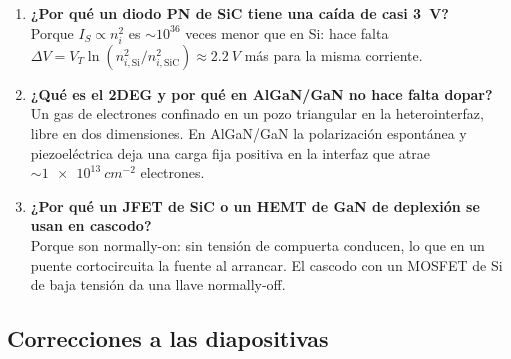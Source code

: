 \begin{enumerate}
  competitivo.
  \item \textbf{¿Por qué un diodo PN de SiC tiene una caída de casi \SI{3}{V}?}\\
  Porque $I_S\propto n_i^2$ es $\sim10^{36}$ veces menor que en Si: hace falta
  $\Delta V=V_T\ln(n_{i,\mathrm{Si}}^2/n_{i,\mathrm{SiC}}^2)\approx\SI{2.2}{V}$ más para la misma
  corriente.
  \item \textbf{¿Qué es el 2DEG y por qué en AlGaN/GaN no hace falta dopar?}\\
  Un gas de electrones confinado en un pozo triangular en la heterointerfaz, libre en dos dimensiones.
  En AlGaN/GaN la polarización espontánea y piezoeléctrica deja una carga fija positiva en la interfaz
  que atrae $\sim\SI{1e13}{cm^{-2}}$ electrones.
  \item \textbf{¿Por qué un JFET de SiC o un HEMT de GaN de deplexión se usan en cascodo?}\\
  Porque son normally-on: sin tensión de compuerta conducen, lo que en un puente cortocircuita la
  fuente al arrancar. El cascodo con un MOSFET de Si de baja tensión da una llave normally-off.
\end{enumerate}

\subsection{Correcciones a las diapositivas}

